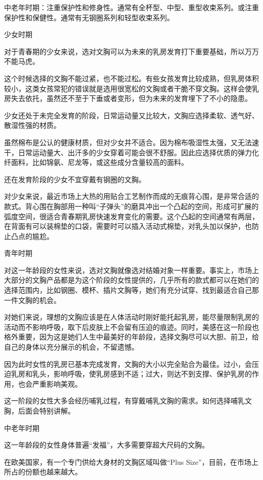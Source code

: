 \documentclass[12pt,UTF8]{ctexbook}
\begin{document}
中老年时期：注重保护性和修身性。通常有全杯型、中型、重型收束系列。或注重保护性和保健性。通常有无钢圈系列和轻型收束系列。

少女时期

对于青春期的少女来说，选对文胸可以为未来的乳房发育打下重要基础，所以万万不能马虎。

这个时候选择的文胸不能过紧，也不能过松。有些女孩发育比较成熟，但乳房体积较小，这类女孩常犯的错误就是选用很宽松的文胸或者干脆不穿文胸。这样会使乳房失去依托，虽然还不至于下垂或者变形，但为未来的发育埋下了不小的隐患。

少女还处于未完全发育的阶段，日常运动量又比较大，文胸应选择柔软、透气好、散湿性强的材质。

虽然棉布是公认的健康材质，但对少女并不适合。因为棉布吸湿性太强，又无法速干，日常运动量大、出汗多的少女穿着可能会很不舒服。因此应选择优质的弹力化纤面料，比如锦氨、尼龙等，或这些成分含量较高的面料。

还在发育阶段的少女不宜穿戴有钢圈的文胸。


对少女来说，最近市场上大热的用贴合工艺制作而成的无痕背心围，是非常合适的款式。背心围在胸部用一种叫“子弹头”的磨具冲出一个凸起的空间，形成可扩展的弧度空间，很适合青春期乳房快速发育变化的需要。这个凸起的空间通常有两层，在背面有可以装棉垫的口袋，需要时可以插入活动式棉垫，对乳头加以保护，也防止凸点的尴尬。

青年时期

对这一年龄段的女性来说，选对文胸就像选对结婚对象一样重要。事实上，市场上大部分的文胸产品都是为这个阶段的女性提供的，几乎所有的款式都可以在她们的选择范围内，比如钢圈、模杯、插片文胸等，她们有充分试穿、找到最适合自己那一件文胸的机会。

对她们来说，理想的文胸应该是在人体活动时刚好能托起乳房，能尽量限制乳房的活动而不影响呼吸，取下后皮肤上不会留有压迫的痕迹。同时，美感在这一阶段也格外重要，因为这是她们人生中最美好的年龄段，选择文胸尽可以大胆、前卫，给自己的身体以充分展示的机会，不留遗憾。

因为此时女性的乳房已基本完成发育，文胸的大小以完全贴合为最佳。过小，会压迫乳房和乳头，影响呼吸，使乳房感到不适；过大，则达不到支撑、保护乳房的作用，也会严重影响美观。

这一阶段的女性大多会经历哺乳过程，有穿戴哺乳文胸的需求。如何选择哺乳文胸，后面会特别讲解。

中老年时期

这一年龄段的女性身体普遍“发福”，大多需要穿超大尺码的文胸。

在欧美国家，有一个专门供给大身材的文胸区域叫做“Plus Size”，目前，在市场上所占的份额也越来越大。
\end{document}
